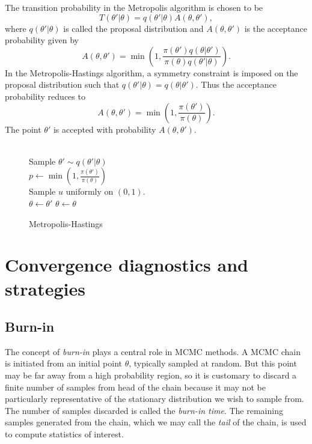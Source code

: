 The transition probability in the Metropolis algorithm is chosen to be
\begin{equation}
  T(\theta'|\theta) = q(\theta'|\theta)A(\theta,\theta'),
\end{equation}
where $q(\theta'|\theta)$ is called the proposal distribution and $A(\theta, \theta')$ is the acceptance probability given by
\begin{equation}
  A(\theta, \theta') = \min \left(1, \frac{\pi(\theta')q(\theta|\theta')}{\pi(\theta)q(\theta'|\theta)}\right).
\end{equation}
In the Metropolis-Hastings algorithm, a symmetry constraint is imposed on the proposal distribution such that 
$q(\theta'|\theta) = q(\theta|\theta')$. Thus the acceptance probability reduces to
\begin{equation}
  A(\theta, \theta') = \min \left(1, \frac{\pi(\theta')}{\pi(\theta)}\right).
\end{equation}
The point $\theta'$ is accepted with probability $A(\theta, \theta')$. 
\begin{figure}[H]
  \begin{algorithm}[H]
    \caption{Metropolis-Hastings}
    \begin{algorithmic}
      \\
      \State Sample $\theta' \sim q(\theta'|\theta)$\\
      \State $p \leftarrow \min \left(1, \frac{\pi(\theta')}{\pi(\theta)}\right)$\\
      \State Sample $u$ uniformly on $(0,1)$. \\
        \State $\theta \leftarrow \theta'$ 
      \Else
        \State $\theta \leftarrow \theta$  
      \EndIf\\
      \EndProcedure
    \end{algorithmic}
  \end{algorithm}
\end{figure}



\section{Convergence diagnostics and strategies}
\subsection{Burn-in}
The concept of \textit{burn-in} plays a central role in MCMC methods. A MCMC chain is initiated from an initial point $\theta$, typically sampled at random. 
But this point may be far away from a high probability region, so it is customary to discard a finite number of samples from head of the chain
because it may not be particularly representative of the stationary distribution we wish to sample from. The number of samples discarded is called the \textit{burn-in time}. The remaining samples generated from
the chain, which we may call the \textit{tail} of the chain, is used to compute statistics of interest. 

